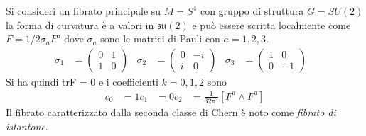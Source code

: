 \begin{example}\label{ex:istantonchern}
   Si consideri un fibrato principale su $M = S^4$ con gruppo di struttura
   $G = SU(2)$ la forma di curvatura è a valori in $\mathfrak{su(2)}$ e può
   essere scritta localmente come $F = 1/2\sigma_a F^a$ dove $\sigma_a$ sono le
   matrici di Pauli con $a = 1,2,3$.
   \begin{equation}
      \begin{aligned}
         \sigma_1 &= \begin{pmatrix} 0 & 1  \\ 1 & 0  \end{pmatrix}&
         \sigma_2 &= \begin{pmatrix} 0 & -i \\ i & 0  \end{pmatrix}&
         \sigma_3 &= \begin{pmatrix} 1 & 0  \\ 0 & -1 \end{pmatrix}&
      \end{aligned}
   \end{equation}
   Si ha quindi trF = 0 e i coefficienti $k = 0,1,2$ sono
   \begin{equation}
      \begin{aligned}
         c_0 & = 1
         c_1 & = 0
         c_2 & = \frac{1}{32\pi^2}[ F^a \wedge F^a ]
      \end{aligned}
   \end{equation}
   Il fibrato caratterizzato dalla seconda classe di Chern è noto come
   \emph{fibrato di istantone}.
\end{example}
